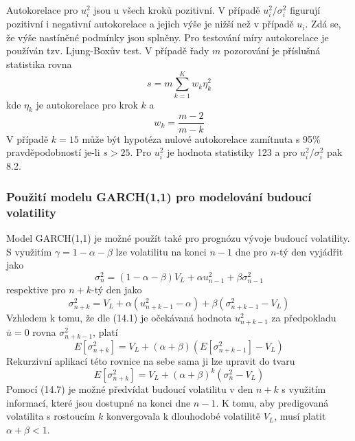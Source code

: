 \documentclass[a4paper]{book}
\begin{document}
Autokorelace pro $u_i^2$ jsou u všech kroků pozitivní. V případě $u_i^2/\sigma_i^2$ figurují pozitivní i negativní autokorelace a jejich výše je nižší než v případě $u_i$. Zdá se, že výše nastíněné podmínky jsou splněny. Pro testování míry autokorelace je používán tzv. Ljung-Boxův test. V případě řady $m$ pozorování je příslušná statistika rovna
\begin{equation*}
s = m \sum_{k=1}^K w_k \eta^2_k
\end{equation*}
kde $\eta_k$ je autokorelace pro krok $k$ a
\begin{equation*}
w_k = \frac{m-2}{m-k}
\end{equation*}
V případě $k=15$ může být hypotéza nulové autokorelace zamítnuta s 95\% pravděpodobností je-li $s>25$. Pro $u_i^2$ je hodnota statistiky 123 a pro $u_i^2/\sigma_i^2$ pak 8.2.

\subsubsection{Použití modelu GARCH(1,1) pro modelování budoucí volatility}

Model GARCH(1,1) je možné použít také pro prognózu vývoje budoucí volatility. S využitím $\gamma = 1 - \alpha - \beta$ lze volatilitu na konci $n-1$ dne pro $n$-tý den vyjádřit jako
\begin{equation*}
\sigma_n^2 = (1 - \alpha - \beta)V_L + \alpha u_{n-1}^2 + \beta \sigma_{n-1}^2
\end{equation*}
respektive pro $n+k$-tý den jako
\begin{equation*}
\sigma_{n+k}^2 = V_L + \alpha (u_{n+k-1}^2-\alpha)+\beta(\sigma_{n+k-1}^2-V_L)
\end{equation*}
Vzhledem k tomu, že dle (14.1) je očekávaná hodnota $u_{n+k-1}^2$ za předpokladu $\bar{u}=0$ rovna $\sigma_{n+k-1}^2$, platí
\begin{equation*}
E[\sigma_{n+k}^2]=V_L + (\alpha + \beta)(E[\sigma_{n+k-1}^2]-V_L)
\end{equation*}
Rekurzivní aplikací této rovnice na sebe sama ji lze upravit do tvaru 
\begin{equation}
E[\sigma_{n+k}^2]=V_L + (\alpha + \beta)^k(\sigma_n^2-V_L)
\end{equation}
Pomocí (14.7) je možné předvídat budoucí volatilitu v den $n+k$ s využitím informací, které jsou dostupné na konci dne $n-1$. K tomu, aby predigovaná volatilita s rostoucím $k$ konvergovala k dlouhodobé volatilitě $V_L$, musí platit $\alpha + \beta < 1$.
\end{document}
